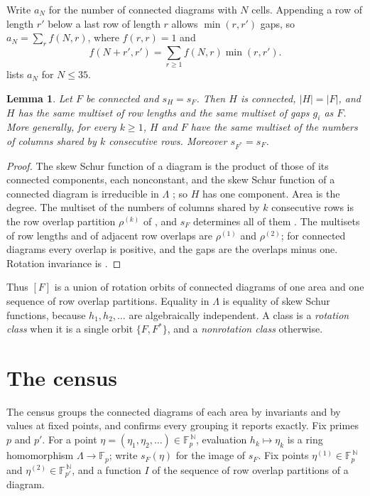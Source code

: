\documentclass[11pt,a4paper]{amsart}
\numberwithin{equation}{section}
\theoremstyle{plain}
\newtheorem{lemma}[theorem]{Lemma}
\theoremstyle{definition}
\newcommand{\Lam}{\Lambda}
\begin{document}
Write \(a_N\) for the number of connected diagrams with \(N\) cells.  Appending a row of length \(r'\) below a last row of length \(r\) allows \(\min(r,r')\) gaps, so \(a_N=\sum_rf(N,r)\), where \(f(r,r)=1\) and
\begin{equation}\label{eq:dp}
 f(N+r',r')=\sum_{r\ge1}f(N,r)\min(r,r').
\end{equation}
 lists \(a_N\) for \(N\le35\).

\begin{lemma}\label{lem:invariants}
Let \(F\) be connected and \(s_H=s_F\).  Then \(H\) is connected, \(|H|=|F|\), and \(H\) has the same multiset of row lengths and the same multiset of gaps \(g_i\) as \(F\).  More generally, for every \(k\ge1\), \(H\) and \(F\) have the same multiset of the numbers of columns shared by \(k\) consecutive rows.  Moreover \(s_{F^*}=s_F\).
\end{lemma}

\begin{proof}
The skew Schur function of a diagram is the product of those of its connected components, each nonconstant, and the skew Schur function of a connected diagram is irreducible in \(\Lam\) \cite{Barekat2009CoincidencesCorrigendum}; so \(H\) has one component.  Area is the degree.  The multiset of the numbers of columns shared by \(k\) consecutive rows is the row overlap partition \(\rho^{(k)}\) of \cite[Def.~8.2]{Reiner2007Coincidences}, and \(s_F\) determines all of them \cite[Cor.~8.11]{Reiner2007Coincidences}.  The multisets of row lengths and of adjacent row overlaps are \(\rho^{(1)}\) and \(\rho^{(2)}\); for connected diagrams every overlap is positive, and the gaps are the overlaps minus one.  Rotation invariance is \cite[Prop.~3.4]{McNamara2009Classification}.
\end{proof}

Thus \([F]\) is a union of rotation orbits of connected diagrams of one area and one sequence of row overlap partitions.  Equality in \(\Lam\) is equality of skew Schur functions, because \(h_1,h_2,\ldots\) are algebraically independent.  A class is a \emph{rotation class} when it is a single orbit \(\{F,F^*\}\), and a \emph{nonrotation class} otherwise.

\section{The census}\label{sec:census}

The census groups the connected diagrams of each area by invariants and by values at fixed points, and confirms every grouping it reports exactly.  Fix primes \(p\) and \(p'\).  For a point \(\eta=(\eta_1,\eta_2,\ldots)\in\mathbb F_p^{\,\mathbb N}\), evaluation \(h_k\mapsto\eta_k\) is a ring homomorphism \(\Lam\to\mathbb F_p\); write \(s_F(\eta)\) for the image of \(s_F\).  Fix points \(\eta^{(1)}\in\mathbb F_p^{\,\mathbb N}\) and \(\eta^{(2)}\in\mathbb F_{p'}^{\,\mathbb N}\), and a function \(I\) of the sequence of row overlap partitions of a diagram.
\end{document}
